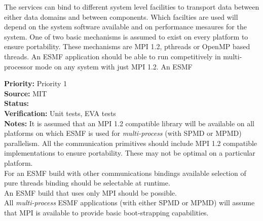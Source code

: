 The {\bf \shortname} services can bind to different system level facilities
to transport data between either data domains and between components.
Which facilties are used will depend on the system software available and
on performance mesaures for the system. One of two basic mechanisms is assumed to
exist on every platform to ensure portability. These mechanisms
are MPI 1.2, pthreads or OpenMP based threads. An ESMF application
should be able to run competitively in multi-processor mode on any system 
with just MPI 1.2. An ESMF 

\begin{reqlist}
{\bf Priority:} Priority 1 \\
{\bf Source:}  MIT \\
{\bf Status:}  \\
{\bf Verification:} Unit tests, EVA tests \\
{\bf Notes:} It is assumed that an MPI 1.2 compatible library
will be available on all platforms on which ESMF is used for {\it multi-process}
(with SPMD or MPMD) parallelism. All the {\bf \shortname} 
communication primitives should include MPI 1.2 compatible implementations
to ensure portability. These may not be optimal on a particular
platform.\\
For an ESMF build with other communications bindings available
selection of pure threads binding should be selectable at runtime.\\
An ESMF build that uses only MPI should be possible.\\
All {\it multi-process} ESMF applications (with either SPMD or MPMD)
will assume that MPI is available to provide basic boot-strapping
capabilities.
\end{reqlist}

